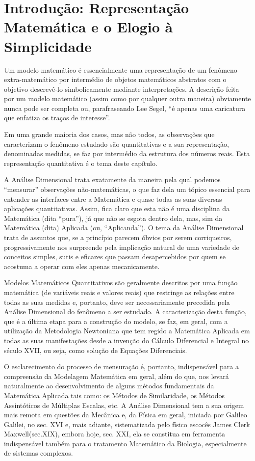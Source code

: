 
\section{Introdução: Representação Matemática e o Elogio à Simplicidade}

Um modelo matemático é essencialmente uma representação de um fenômeno extra-matemático por intermédio de objetos matemáticos abstratos com o objetivo descrevê-lo simbolicamente mediante interpretações. A descrição feita por um modelo matemático (assim como por qualquer outra maneira) obviamente nunca pode ser completa ou, parafraseando Lee Segel, “é apenas uma caricatura que enfatiza os traços de interesse”.

Em uma grande maioria dos casos, mas não todos, as observações que caracterizam o fenômeno estudado são quantitativas e a sua representação, denominadas medidas, se faz por intermédio da estrutura dos números reais. Esta representação quantitativa é o tema deste capítulo.

A Análise Dimensional trata exatamente da maneira pela qual podemos “mensurar” observações não-matemáticas, o que faz dela um tópico essencial para entender as interfaces entre a Matemática e quase todas as suas diversas aplicações quantitativas. Assim, fica claro que esta não é uma disciplina da Matemática (dita “pura”), já que não se esgota dentro dela, mas, sim da Matemática (dita) Aplicada (ou, “Aplicanda”). O tema da Análise Dimensional trata de assuntos que, se a princípio parecem óbvios por serem corriqueiros, progressivamente nos surpreende pela implicação natural de uma variedade de conceitos simples, sutis e eficazes que passam desapercebidos por quem se acostuma a operar com eles apenas mecanicamente.

Modelos Matemáticos Quantitativos são geralmente descritos por uma função matemática (de variáveis reais e valores reais) que restringe as relações entre todas as suas medidas e, portanto, deve ser necessariamente precedida pela Análise Dimensional do fenômeno a ser estudado. A caracterização desta função, que é a última etapa para a construção do modelo, se faz, em geral, com a utilização da Metodologia Newtoniana que tem regido a Matemática Aplicada em todas as suas manifestações desde a invenção do Cálculo Diferencial e Integral no século XVII, ou seja, como solução de Equações Diferenciais.

O esclarecimento do processo de mensuração é, portanto, indispensável para a compreensão da Modelagem Matemática em geral, além do que, nos levará naturalmente ao desenvolvimento de alguns métodos fundamentais da Matemática Aplicada tais como: os Métodos de Similaridade, os Métodos Assintóticos de Múltiplas Escalas, etc. A Análise Dimensional tem a sua origem mais remota em questões da Mecânica e, da Física em geral, iniciada por Galileo Galilei, no sec. XVI e, mais adiante, sistematizada pelo físico escocês James Clerk Maxwell(sec.XIX), embora hoje, sec. XXI, ela se constitua em ferramenta indispensável também para o tratamento Matemático da Biologia, especialmente de sistemas complexos.

